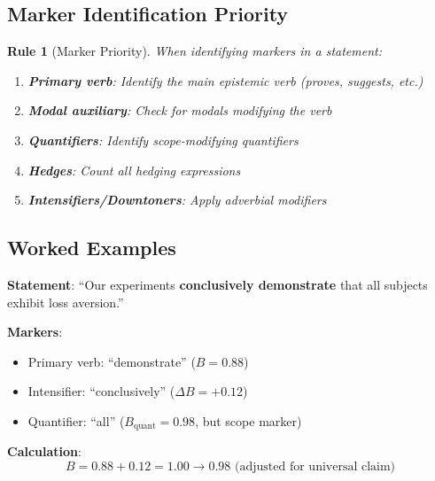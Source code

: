 \documentclass[11pt,a4paper]{article}
\newtheorem{rule_def}{Rule}[section]
\theoremstyle{remark}
\begin{document}
\subsection{Marker Identification Priority}

\begin{rule_def}[Marker Priority]
\label{rule:priority}
When identifying markers in a statement:
\begin{enumerate}
    \item \textbf{Primary verb}: Identify the main epistemic verb (proves, suggests, etc.)
    \item \textbf{Modal auxiliary}: Check for modals modifying the verb
    \item \textbf{Quantifiers}: Identify scope-modifying quantifiers
    \item \textbf{Hedges}: Count all hedging expressions
    \item \textbf{Intensifiers/Downtoners}: Apply adverbial modifiers
\end{enumerate}
\end{rule_def}

\subsection{Worked Examples}

\begin{calculationbox}[title={Example 1: Strong Claim}]
\textbf{Statement}: ``Our experiments \textbf{conclusively demonstrate} that all subjects exhibit loss aversion.''

\textbf{Markers}:
\begin{itemize}
    \item Primary verb: ``demonstrate'' ($B = 0.88$)
    \item Intensifier: ``conclusively'' ($\Delta B = +0.12$)
    \item Quantifier: ``all'' ($B_{\text{quant}} = 0.98$, but scope marker)
\end{itemize}

\textbf{Calculation}:
\begin{equation}
B = 0.88 + 0.12 = 1.00 \to 0.98 \text{ (adjusted for universal claim)}
\end{equation}
\end{calculationbox}
\end{document}
